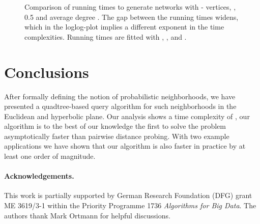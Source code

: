 \documentclass{llncs}
\begin{document}
\newcommand{\aconst}{5.605}
\newcommand{\bconst}{2.18}
\newcommand{\cconst}{1.77}
\begin{figure}[tb]
\centering


 \caption{Comparison of running times to generate networks with - vertices, , 0.5 and average degree . The gap between the running times widens, which in the loglog-plot implies a different exponent in the time complexities.
 Running times are fitted with , ,  and . }
 \label{plot:time-scatter}
\end{figure}


\section{Conclusions}
After formally defining the notion of probabilistic neighborhoods, we have presented a
quadtree-based query algorithm for such neighborhoods in the Euclidean and hyperbolic plane.
Our analysis shows a time complexity of , our algorithm is to the best of our knowledge the first to solve the problem asymptotically faster than pairwise distance probing.
With two example applications we have shown that our algorithm is also faster 
in practice by at least one order of magnitude.


\paragraph{Acknowledgements.}
This work is partially supported by German Research Foundation (DFG) grant ME 3619/3-1 within the 
Priority Programme 1736 \emph{Algorithms for Big Data}. The authors thank Mark Ortmann for helpful discussions.
\end{document}
